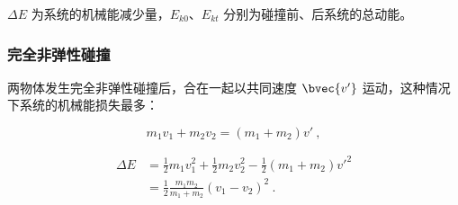 $\Delta E$ 为系统的机械能减少量，$E_{k0}$、$ E_{kt}$ 分别为碰撞前、后系统的总动能。

\subsubsection{完全非弹性碰撞}

两物体发生完全非弹性碰撞后，合在一起以共同速度 $\bvec {v'}$ 运动，这种情况下系统的机械能损失最多：

\begin{equation}
m_1v_1+m_2v_2=(m_1+m_2)v'~,
\end{equation}

\begin{equation}
\begin{aligned}
\Delta E&=\frac12m_1v_1^2+\frac12m_2v_2^2-\frac12(m_1+m_2)v'^2\\
&=\frac{1}{2}\frac{m_1m_2}{m_1+m_2}\left(v_1-v_2\right)^2~.\\
\end{aligned}
\end{equation}



